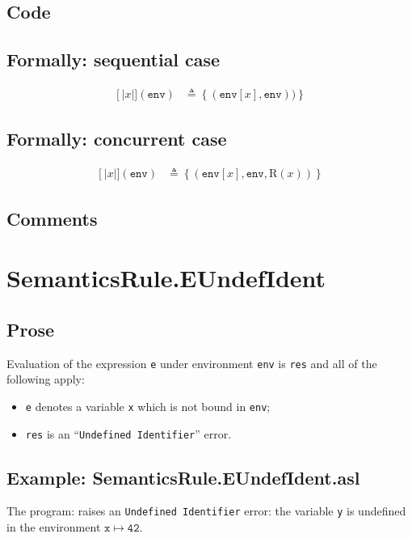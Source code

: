 \documentclass{book}
\newcommand\llbracket{[|}
\newcommand\rrbracket{|]}
\newcommand\interp[1]{\left\llbracket #1 \right\rrbracket}
\begin{document}
  \subsection{Code}

  \subsection{Formally: sequential case}
  \begin{align}
  \interp{x}(\texttt{env}) & \triangleq \left\{ (\texttt{env}[x], \texttt{env})) \right\}
  \label{eq:sem-seq-var}
  \end{align} 
 
  \subsection{Formally: concurrent case}
  \begin{align}
  \interp{x}(\texttt{env}) & \triangleq \left\{ (\texttt{env}[x], \texttt{env}, \text{R} (x)) \right\}
  \label{eq:sem-conc-var}
  \end{align} 

  \subsection{Comments}

\section{SemanticsRule.EUndefIdent \label{sec:SemanticsRule.EUndefIdent}}

  \subsection{Prose}

  Evaluation of the expression \texttt{e} under environment \texttt{env} is
  \texttt{res} and all of the following apply:
  \begin{itemize}
  \item \texttt{e} denotes a variable \texttt{x} which is not bound in \texttt{env};
  \item \texttt{res} is an ``\texttt{Undefined Identifier}'' error.
  \end{itemize}

  \subsection{Example: SemanticsRule.EUndefIdent.asl}
    The program:
    raises an \texttt{Undefined Identifier} error: the variable \texttt{y} is
    undefined in the environment $\mathtt{x} \mapsto \mathtt{42}$.
\end{document}
